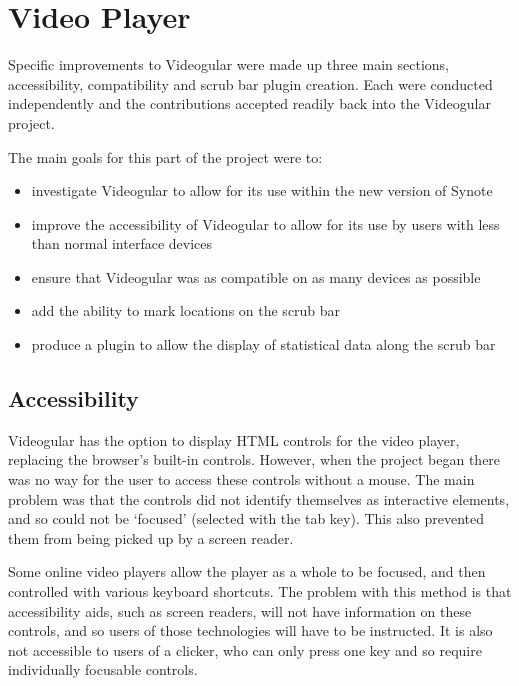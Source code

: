 
\chapter{Video Player}
\label{Chapter:Video Player}

\begin{preamble}
Specific improvements to \gls{Videogular} were made up three main sections, accessibility, compatibility and scrub bar plugin creation. Each were conducted independently and the contributions accepted readily back into the \gls{Videogular} project.

The main goals for this part of the project were to:
\begin{itemize}
\item investigate \gls{Videogular} to allow for its use within the new version of Synote
\item improve the accessibility of \gls{Videogular} to allow for its use by users with less than normal interface  devices
\item ensure that \gls{Videogular} was as compatible on as many devices as possible
\item add the ability to mark locations on the scrub bar
\item produce a plugin to allow the display of statistical data along the scrub bar
\end{itemize}
\end{preamble}

\section{Accessibility}
\label{Section:Accessibility}
\gls{Videogular} has the option to display HTML controls for the video player, replacing the browser's built-in controls. However, when the project began there was no way for the user to access these controls without a mouse. The main problem was that the controls did not identify themselves as interactive elements, and so could not be `focused' (selected with the tab key). This also prevented them from being picked up by a screen reader.

Some online video players allow the player as a whole to be focused, and then controlled with various keyboard shortcuts. The problem with this method is that accessibility aids, such as screen readers, will not have information on these controls, and so users of those technologies will have to be instructed. It is also not accessible to users of a clicker, who can only press one key and so require individually focusable controls.

